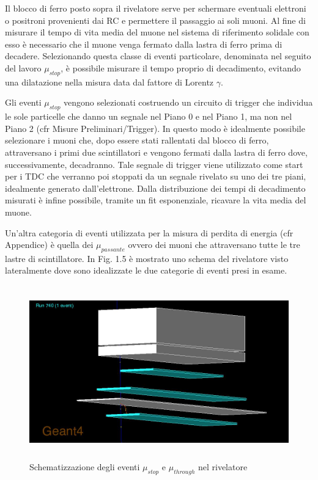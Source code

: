 \documentclass{standalone}
\begin{document}
Il blocco di ferro posto sopra il rivelatore serve per schermare eventuali elettroni o positroni provenienti dai RC e permettere il passaggio ai soli muoni.
Al fine di misurare il tempo di vita media del muone nel sistema di riferimento solidale con esso \`e necessario che il muone venga fermato dalla lastra di ferro prima di decadere. Selezionando questa classe di eventi particolare, denominata nel seguito del lavoro $\mu_{stop}$, \`e possibile misurare il tempo proprio di decadimento, evitando una dilatazione nella misura data dal fattore di Lorentz $\gamma$.

Gli eventi $\mu_{stop}$ vengono selezionati costruendo un circuito di trigger che individua le sole particelle che danno un segnale nel Piano 0 e nel Piano 1, ma non nel Piano 2 (cfr Misure Preliminari/Trigger). In questo modo \`e idealmente possibile selezionare i muoni che, dopo essere stati rallentati dal blocco di ferro, attraversano i primi due scintillatori e vengono fermati dalla lastra di ferro dove, successivamente, decadranno.
Tale segnale di trigger viene utilizzato come start per i TDC che verranno poi stoppati da un segnale rivelato su uno dei tre piani, idealmente generato dall'elettrone. Dalla distribuzione dei tempi di decadimento misurati \`e infine possibile, tramite un fit esponenziale, ricavare la vita media del muone.

Un'altra categoria di eventi utilizzata per la misura di perdita di energia (cfr Appendice) \`e quella dei $\mu_{passante}$ ovvero dei muoni che attraversano tutte le tre lastre di scintillatore. In Fig. 1.5 \`e mostrato uno schema del rivelatore visto lateralmente dove sono idealizzate le due categorie di eventi presi in esame.

\begin{figure}[H]
	\centering
  \includegraphics[width=13cm, height=7.5cm]{images/mu_stop.jpg}
	\caption{Schematizzazione degli eventi $\mu_{stop}$ e $\mu_{through}$ nel rivelatore}
\end{figure}
\end{document}
